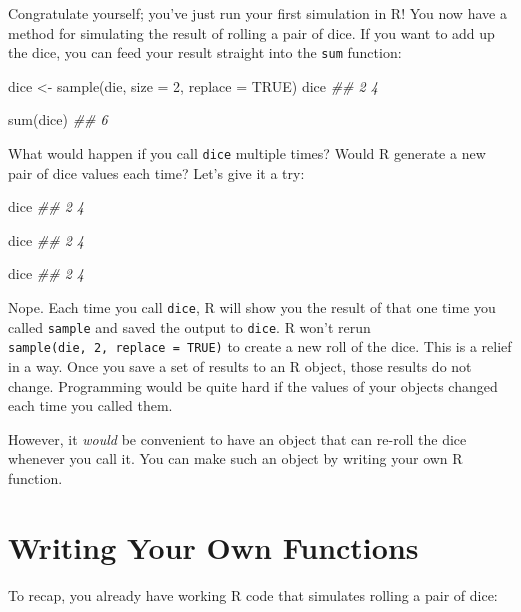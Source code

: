\documentclass[
  letterpaper,
  DIV=11,
  numbers=noendperiod]{scrbook}
\newenvironment{Shaded}{\begin{snugshade}}{\end{snugshade}}
\newcommand{\AttributeTok}[1]{\textcolor[rgb]{0.40,0.45,0.13}{#1}}
\newcommand{\ConstantTok}[1]{\textcolor[rgb]{0.56,0.35,0.01}{#1}}
\newcommand{\DecValTok}[1]{\textcolor[rgb]{0.68,0.00,0.00}{#1}}
\newcommand{\DocumentationTok}[1]{\textcolor[rgb]{0.37,0.37,0.37}{\textit{#1}}}
\newcommand{\FunctionTok}[1]{\textcolor[rgb]{0.28,0.35,0.67}{#1}}
\newcommand{\NormalTok}[1]{\textcolor[rgb]{0.00,0.23,0.31}{#1}}
\newcommand{\OtherTok}[1]{\textcolor[rgb]{0.00,0.23,0.31}{#1}}
\begin{document}
Congratulate yourself; you've just run your first simulation in R! You
now have a method for simulating the result of rolling a pair of dice.
If you want to add up the dice, you can feed your result straight into
the \texttt{sum} function:

\begin{Shaded}
\begin{Highlighting}[]
\NormalTok{dice }\OtherTok{\textless{}{-}} \FunctionTok{sample}\NormalTok{(die, }\AttributeTok{size =} \DecValTok{2}\NormalTok{, }\AttributeTok{replace =} \ConstantTok{TRUE}\NormalTok{)}
\NormalTok{dice}
\DocumentationTok{\#\# 2 4}

\FunctionTok{sum}\NormalTok{(dice)}
\DocumentationTok{\#\# 6}
\end{Highlighting}
\end{Shaded}

What would happen if you call \texttt{dice} multiple times? Would R
generate a new pair of dice values each time? Let's give it a try:

\begin{Shaded}
\begin{Highlighting}[]
\NormalTok{dice}
\DocumentationTok{\#\# 2 4}

\NormalTok{dice}
\DocumentationTok{\#\# 2 4}

\NormalTok{dice}
\DocumentationTok{\#\# 2 4}
\end{Highlighting}
\end{Shaded}

Nope. Each time you call \texttt{dice}, R will show you the result of
that one time you called \texttt{sample} and saved the output to
\texttt{dice}. R won't rerun \texttt{sample(die,\ 2,\ replace\ =\ TRUE)}
to create a new roll of the dice. This is a relief in a way. Once you
save a set of results to an R object, those results do not change.
Programming would be quite hard if the values of your objects changed
each time you called them.

However, it \emph{would} be convenient to have an object that can
re-roll the dice whenever you call it. You can make such an object by
writing your own R function.

\section{Writing Your Own Functions}\label{sec-write-functions}

To recap, you already have working R code that simulates rolling a pair
of dice:
\end{document}
